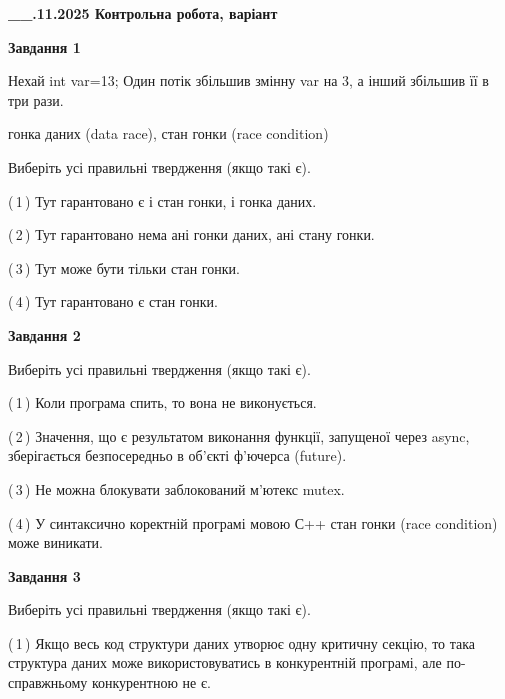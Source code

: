 \documentclass[12pt, ukrainian]{article}
\begin{document}
\begin {large}

\textbf{\_\_.11.2025 Контрольна робота, варіант  }\par


{

\begin{center}
\textbf{Завдання 1}
\end{center}
Нехай int var=13; Один потік збільшив змінну var на 3, а інший збільшив її в три рази.

гонка даних (data race), стан гонки (race condition)

Виберіть усі правильні твердження (якщо такі є).\par
\vspace{2mm}
(\,1\,) Тут гарантовано є і стан гонки, і гонка даних.%

(\,2\,) Тут гарантовано нема ані гонки даних, ані стану гонки.%

(\,3\,) Тут може бути тільки стан гонки.%

(\,4\,) Тут гарантовано є стан гонки.%



\begin{center}
\textbf{Завдання 2}
\end{center}
Виберіть усі правильні твердження (якщо такі є).\par
\vspace{2mm}

(\,1\,) Коли програма спить, то вона не виконується.%

(\,2\,) Значення, що є результатом виконання функції, запущеної через async, зберігається безпосередньо в об’єкті ф’ючерса (future).%

(\,3\,) Не можна блокувати заблокований м’ютекс mutex.%

(\,4\,) У синтаксично коректній програмі мовою С++ стан гонки (race condition) може виникати.%



\begin{center}
\textbf{Завдання 3}
\end{center}
Виберіть усі правильні твердження (якщо такі є).\par
\vspace{2mm}

(\,1\,) Якщо весь код структури даних утворює одну критичну секцію, то така структура даних може використовуватись в конкурентній програмі, але по-справжньо\-му конкурентною не є.%

}
\end{large}
\end{document}
